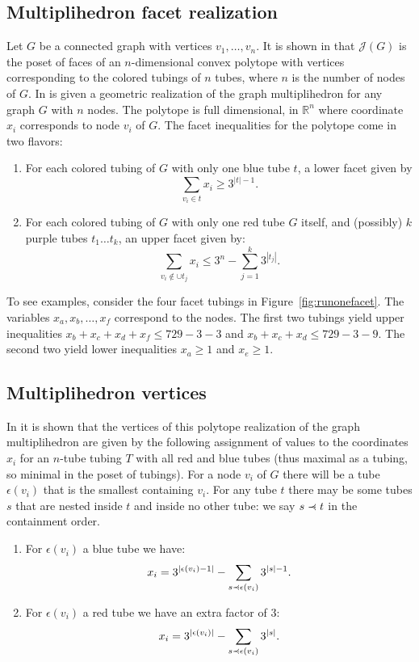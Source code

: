 \documentclass{article}
\newcommand{\precdot}{\prec\mathrel{\mkern-5mu}\mathrel{\cdot}}
\begin{document}
\subsection{Multiplihedron facet realization}\label{rev1} Let $G$ be a connected graph with vertices $v_1,\dots,v_n.$ It is shown in \cite{dev-forc} that $\mathcal{J}(G)$ is the poset of faces of an $n$-dimensional convex polytope with vertices corresponding to the colored tubings of $n$ tubes, where $n$ is the number of nodes of $G.$
In \cite{dev-forc} is given a geometric realization of the graph multiplihedron  for any graph $G$ with $n$ nodes. The polytope is full dimensional, in $\mathbb{R}^n$ where coordinate $x_i$ corresponds to node $v_i$ of $G$. The facet inequalities for the polytope come in two flavors:
\begin{enumerate}
    \item For each colored tubing of $G$ with only one blue tube $t$, a lower facet given by $$\sum_{v_i\in t} x_i \ge 3^{|t|-1} .$$
    \item For each colored tubing of $G$ with only one red tube $G$ itself, and (possibly) $k$ purple tubes $t_1\dots t_k$, an upper facet given by: $$\sum_{v_i\notin \cup t_j}x_i \le 3^n-\sum_{j=1}^k3^{|t_j|}.$$
\end{enumerate}

To see examples, consider the four facet tubings in Figure~\ref{fig:runonefacet}. The variables $x_a,x_b,\dots,x_f$ correspond to the nodes. The first two tubings yield upper inequalities $x_b+x_c+x_d+x_f \le 729-3-3$ and $x_b+x_c+x_d \le 729-3-9.$ The second two yield lower inequalities $x_a \ge 1$ and $x_e \ge 1.$ 

\subsection{Multiplihedron vertices}\label{vert} In \cite{dev-forc} it is shown that the vertices of this polytope realization of the graph multiplihedron are given by the following assignment of values to the coordinates $x_i$ for an $n$-tube tubing $T$ with all red and blue tubes (thus maximal as a tubing, so minimal in the poset of tubings). For a node $v_i$ of $G$ there will be a tube $\epsilon(v_i)$ that is the smallest containing $v_i$. For any tube $t$ there may be some tubes $s$ that are nested inside $t$ and inside no other tube: we say $s\precdot t$ in the containment order. 
\begin{enumerate}
    \item 
 For $\epsilon(v_i)$ a blue tube we have:
$$x_i= 3^{|\epsilon(v_i)-1|} - \sum_{s\precdot \epsilon(v_i)}3^{|s|-1}.$$
\item For $\epsilon(v_i)$ a red tube we have an extra factor of 3:
$$x_i= 3^{|\epsilon(v_i)|} - \sum_{s\precdot \epsilon(v_i)}3^{|s|}.$$
\end{enumerate}
\end{document}
